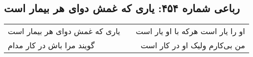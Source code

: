 \begin{center}
\section*{رباعی شماره ۴۵۴: یاری که غمش دوای هر بیمار است}
\label{sec:0454}
\begin{longtable}{l p{0.5cm} r}
یاری که غمش دوای هر بیمار است
&&
او را یار است هرکه با او یار است
\\
گویند مرا باش در کار مدام
&&
من بی‌کارم ولیک او در کار است
\\
\end{longtable}
\end{center}
